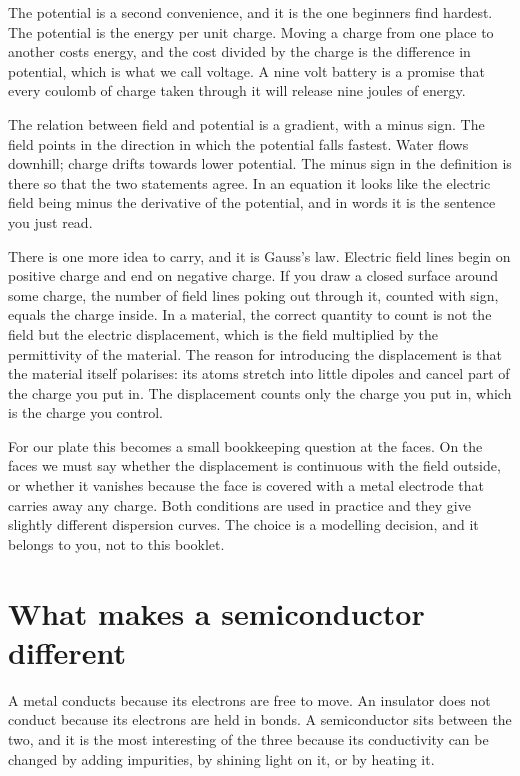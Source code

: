 \documentclass[11pt]{article}
\begin{document}
The potential is a second convenience, and it is the one beginners find hardest. The potential is the energy
per unit charge. Moving a charge from one place to another costs energy, and the cost divided by the charge is
the difference in potential, which is what we call voltage. A nine volt battery is a promise that every
coulomb of charge taken through it will release nine joules of energy.

The relation between field and potential is a gradient, with a minus sign. The field points in the direction
in which the potential falls fastest. Water flows downhill; charge drifts towards lower potential. The minus
sign in the definition is there so that the two statements agree. In an equation it looks like the electric
field being minus the derivative of the potential, and in words it is the sentence you just read.

There is one more idea to carry, and it is Gauss's law. Electric field lines begin on positive charge and end
on negative charge. If you draw a closed surface around some charge, the number of field lines poking out
through it, counted with sign, equals the charge inside. In a material, the correct quantity to count is not
the field but the electric displacement, which is the field multiplied by the permittivity of the material.
The reason for introducing the displacement is that the material itself polarises: its atoms stretch into
little dipoles and cancel part of the charge you put in. The displacement counts only the charge you put in,
which is the charge you control.

For our plate this becomes a small bookkeeping question at the faces. On the faces we must say whether the
displacement is continuous with the field outside, or whether it vanishes because the face is covered with a
metal electrode that carries away any charge. Both conditions are used in practice and they give slightly
different dispersion curves. The choice is a modelling decision, and it belongs to you, not to this booklet.

\section{What makes a semiconductor different}

A metal conducts because its electrons are free to move. An insulator does not conduct because its electrons
are held in bonds. A semiconductor sits between the two, and it is the most interesting of the three because
its conductivity can be changed by adding impurities, by shining light on it, or by heating it.
\end{document}
